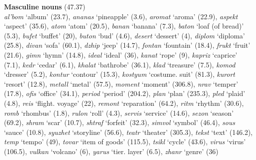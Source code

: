\documentclass[output=paper, modfonts,newtxmath,hidelinks]{langscibook}
\begin{document}
\noindent\textbf{Masculine nouns} (47.37)\\

\noindent\textit{al'bom} `album' (23.7),
\textit{ananas} `pineapple' (3.6),
\textit{aromat} `aroma' (22.9),
\textit{aspekt} `aspect' (35.6),
\textit{atom} `atom' (20.5),
\textit{banan} `banana' (7.3),
\textit{baton} `loaf (of bread)' (5.3),
\textit{bufet} `buffet' (20),
\textit{buton} `bud' (4.6),
\textit{desert} `dessert' (4),
\textit{diplom} `diploma' (25.8),
\textit{divan} `sofa' (60.1),
\textit{dzhip} `jeep' (14.7),
\textit{fontan} `fountain' (18.4),
\textit{frukt} `fruit' (21.6),
\textit{gimn} `hymn' (14.8),
\textit{ideal} `ideal' (36),
\textit{kanat} `rope' (9),
\textit{kapriz} `caprice' (7.1),
\textit{kedr} `cedar' (6.1),
\textit{khalat} `bathrobe' (36.1),
\textit{klad} `treasure' (7.5),
\textit{komod} `dresser' (5.2),
\textit{kontur} `contour' (15.3),
\textit{kostyum} `costume. suit' (81.3),
\textit{kurort} `resort' (12.8),
\textit{metall} `metal' (57.5),
\textit{moment} `moment' (306.8),
\textit{nrav} `temper' (17.8),
\textit{ofis} `office' (34.1),
\textit{period} `period' (204.2),
\textit{plan} `plan' (235.3),
\textit{pled} `plaid' (4.8),
\textit{reis} `flight. voyage' (22),
\textit{remont} `reparation' (64.2),
\textit{ritm} `rhythm' (30.6),
\textit{romb} `rhombus' (1.8),
\textit{rulon} `roll' (4.3),
\textit{servis} `service' (14.6),
\textit{sezon} `season' (69.2),
\textit{shram} `scar' (10.7),
\textit{shtraf} `forfeit' (32.3),
\textit{simvol} `symbol' (46.4),
\textit{sous} `sauce' (10.8),
\textit{syuzhet} `storyline' (56.6),
\textit{teatr} `theater' (305.3),
\textit{tekst} `text' (146.2),
\textit{temp} `tempo' (49),
\textit{tovar} `item of goods' (115.5),
\textit{tsikl} `cycle' (43.6),
\textit{virus} `virus' (106.5),
\textit{vulkan} `volcano' (6),
\textit{yarus} `tier. layer' (6.5),
\textit{zhanr} `genre' (36)
\end{document}
